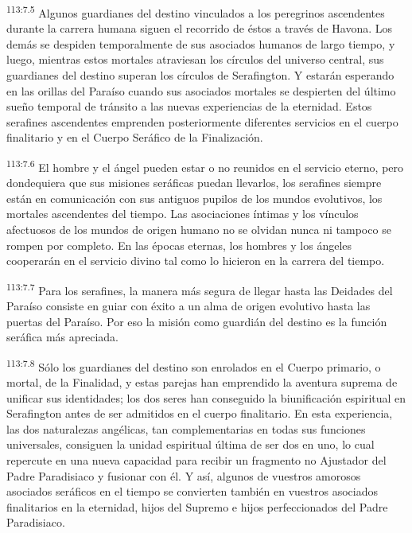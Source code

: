 \documentclass[twoside, 11pt]{book}
\begin{document}
\par
\textsuperscript{113:7.5} Algunos guardianes del destino vinculados a los peregrinos ascendentes durante la carrera humana siguen el recorrido de éstos a través de Havona. Los demás se despiden temporalmente de sus asociados humanos de largo tiempo, y luego, mientras estos mortales atraviesan los círculos del universo central, sus guardianes del destino superan los círculos de Serafington. Y estarán esperando en las orillas del Paraíso cuando sus asociados mortales se despierten del último sueño temporal de tránsito a las nuevas experiencias de la eternidad. Estos serafines ascendentes emprenden posteriormente diferentes servicios en el cuerpo finalitario y en el Cuerpo Seráfico de la Finalización.

\par
\textsuperscript{113:7.6} El hombre y el ángel pueden estar o no reunidos en el servicio eterno, pero dondequiera que sus misiones seráficas puedan llevarlos, los serafines siempre están en comunicación con sus antiguos pupilos de los mundos evolutivos, los mortales ascendentes del tiempo. Las asociaciones íntimas y los vínculos afectuosos de los mundos de origen humano no se olvidan nunca ni tampoco se rompen por completo. En las épocas eternas, los hombres y los ángeles cooperarán en el servicio divino tal como lo hicieron en la carrera del tiempo.

\par
\textsuperscript{113:7.7} Para los serafines, la manera más segura de llegar hasta las Deidades del Paraíso consiste en guiar con éxito a un alma de origen evolutivo hasta las puertas del Paraíso. Por eso la misión como guardián del destino es la función seráfica más apreciada.

\par
\textsuperscript{113:7.8} Sólo los guardianes del destino son enrolados en el Cuerpo primario, o mortal, de la Finalidad, y estas parejas han emprendido la aventura suprema de unificar sus identidades; los dos seres han conseguido la biunificación espiritual en Serafington antes de ser admitidos en el cuerpo finalitario. En esta experiencia, las dos naturalezas angélicas, tan complementarias en todas sus funciones universales, consiguen la unidad espiritual última de ser dos en uno, lo cual repercute en una nueva capacidad para recibir un fragmento no Ajustador del Padre Paradisiaco y fusionar con él. Y así, algunos de vuestros amorosos asociados seráficos en el tiempo se convierten también en vuestros asociados finalitarios en la eternidad, hijos del Supremo e hijos perfeccionados del Padre Paradisiaco.
\end{document}
